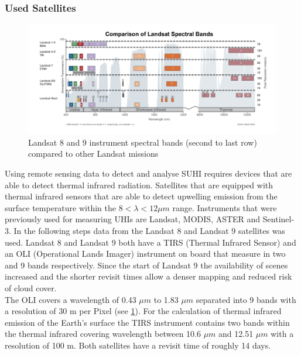 \documentclass[12pt,a4paper, english]{article}
\begin{document}
    \subsubsection{Used Satellites}\label{sec:landsat}
    \begin{figure}[htbp]
       \begin{center}
         \includegraphics[width=.98\textwidth]{img/LandsatSpectralBands.png}
       \end{center}
       \caption{Landsat 8 and 9 instrument spectral bands (second to last row) compared to other Landsat missions\autocite{USGSWebsite}\label{fig:lsspectral}}
      \end{figure}
      \noindent
    Using remote sensing data to detect and analyse \gls{SUHI} requires devices that are able to detect thermal infrared radiation. 
    Satellites that are equipped with thermal infrared sensors that are able to detect upwelling emission from the surface temperature within the $ 8 < \lambda < 12 \mu m $ range. 
    Instruments that were previously used for measuring \glspl{UHI} are Landsat, MODIS, ASTER and Sentinel-3. 
    In the following steps data from the Landsat 8 and Landsat 9 satellites was used.%
    Landsat 8 and Landsat 9 both have a TIRS (Thermal Infrared Sensor) and an OLI (Operational Lands Imager) instrument on board that measure in two and 9 bands respectively.
    Since the start of Landsat 9 the availability of scenes increased and the shorter revisit times allow a denser mapping and reduced risk of cloud cover. \\ 
    The OLI covers a wavelength of 0.43 $\mu m$ to 1.83 $\mu m$ separated into 9 bands with a resolution of 30 m per Pixel (see \cref{fig:lsspectral}). 
    For the calculation of thermal infrared emission of the Earth's surface the TIRS instrument contains two bands within the thermal infrared covering wavelength between 10.6 $\mu m$ and 12.51 $\mu m$ with a resolution of 100 m.
  Both satellites have a revisit time of roughly 14 days. 
\end{document}
